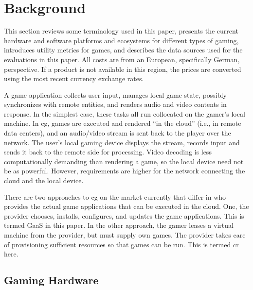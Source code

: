 \section{Background}
\label{sec:background}
This section reviews some terminology used in this paper,
presents the current hardware and software platforms and ecosystems
for different types of gaming, introduces utility metrics for games,
and describes the data sources used for the evaluations in this paper.
All costs are from an European, specifically German, perspective. If a
product is not available in this region, the prices are converted using
the most recent currency exchange rates.



A game application collects user input, manages local game state,
possibly synchronizes with remote entities, and renders audio and
video contents in response. In the simplest case, these tasks all
run collocated on the gamer's local machine.
In \gls{cg}, games are executed and rendered ``in the cloud''
(i.e., in remote data centers), and an audio/video stream is sent back
to the player over the network. The user's local gaming device displays
the stream, records input and sends it back to the remote side for
processing. Video decoding is less computationally demanding than
rendering a game, so
the local device need not be as powerful. However, requirements
are higher for the network connecting the cloud and the local device.

There are two approaches to \gls{cg} on the market currently that
differ in who provides the actual game applications that can be
executed in the cloud. One, the provider chooses, installs, configures,
and updates the game applications. This is termed \acrfull{GaaS} in
this paper.
In the other approach, the gamer leases a virtual machine from the
provider, but must supply own games. The provider takes care of
provisioning sufficient resources so that games can be run. This
is termed \gls{cr} here.

\subsection{Gaming Hardware}\label{sec:gaming-hardware}

